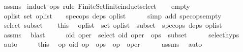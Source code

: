 \begin{isabellebody}
%
\isadelimproof
%
\endisadelimproof
%
\isatagproof
{}\isamarkupfalse%
\ assms\ \isamarkupfalse%
{\isacharparenleft}induct\ ops\ rule{\isacharcolon}\ Finite{\isacharunderscore}Set{\isachardot}finite{\isacharunderscore}induct{\isacharunderscore}select{\isacharparenright}\isanewline
\ \ \isamarkupfalse%
\ empty\isanewline
\ \ \isamarkupfalse%
\ \isamarkupfalse%
\ {\isachardoublequoteopen}{\isasymexists}op{\isacharunderscore}list{\isachardot}\ set\ op{\isacharunderscore}list\ {\isacharequal}\ {\isacharbraceleft}{\isacharbraceright}\ {\isasymand}\ spec{\isacharunderscore}ops\ deps\ op{\isacharunderscore}list{\isachardoublequoteclose}\isanewline
\ \ \ \ \isamarkupfalse%
\ {\isacharparenleft}simp\ add{\isacharcolon}\ spec{\isacharunderscore}ops{\isacharunderscore}empty{\isacharparenright}\isanewline
{}\isamarkupfalse%
\isanewline
\ \ \isamarkupfalse%
\ {\isacharparenleft}select\ subset{\isacharparenright}\isanewline
\ \ \isamarkupfalse%
\ this\ \isamarkupfalse%
\ op{\isacharunderscore}list\ \ {\isachardoublequoteopen}set\ op{\isacharunderscore}list\ {\isacharequal}\ subset{\isachardoublequoteclose}\ \ {\isachardoublequoteopen}spec{\isacharunderscore}ops\ deps\ op{\isacharunderscore}list{\isachardoublequoteclose}\isanewline
\ \ \ \ \isamarkupfalse%
\ assms\ \isamarkupfalse%
\ blast\isanewline
\ \ \isamarkupfalse%
\ \isamarkupfalse%
\ oid\ oper\ \ select{\isacharcolon}\ {\isachardoublequoteopen}{\isacharparenleft}oid{\isacharcomma}\ oper{\isacharparenright}\ {\isasymin}\ ops\ {\isacharminus}\ subset{\isachardoublequoteclose}\isanewline
\ \ \ \ \isamarkupfalse%
\ select{\isachardot}hyps{\isacharparenleft}{}{\isacharparenright}\ \isamarkupfalse%
\ auto\isanewline
\ \ \isamarkupfalse%
\ \isamarkupfalse%
\ this\ \isamarkupfalse%
\ {\isachardoublequoteopen}{\isasymAnd}op{}{\isachardot}\ {\isacharparenleft}oid{\isacharcomma}\ op{}{\isacharparenright}\ {\isasymin}\ ops\ {\isasymLongrightarrow}\ op{}\ {\isacharequal}\ oper{\isachardoublequoteclose}\isanewline
\ \ \ \ \isamarkupfalse%
\ assms{\isacharparenleft}{}{\isacharparenright}\ \isamarkupfalse%
\ auto\isanewline
\ \ \isamarkupfalse%

\end{isabellebody}
